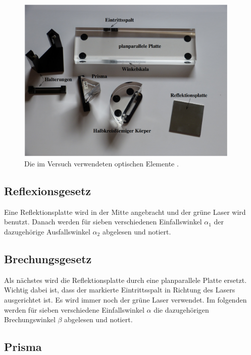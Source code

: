 \begin{figure}[H]
    \centering
    \includegraphics[height=80mm]{bilder/Ab5.png}
    \caption{Die im Versuch verwendeten optischen Elemente \cite{a1}.\label{Abbildung5} }
\end{figure}

\subsection{Reflexionsgesetz}

\begin{flushleft}
    Eine Reflektionsplatte wird in der Mitte angebracht und der grüne Laser wird benutzt.
    Danach werden für sieben verschiedenen Einfallswinkel $\alpha_{1}$ der dazugehörige Ausfallswinkel $\alpha_{2}$ abgelesen und notiert.
\end{flushleft}

\subsection{Brechungsgesetz}

\begin{flushleft}
    Als nächstes wird die Reflektionsplatte durch eine planparallele Platte ersetzt. 
    Wichtig dabei ist, dass der markierte Eintrittsspalt in Richtung des Lasers ausgerichtet ist.
    Es wird immer noch der grüne Laser verwendet.
    Im folgenden werden für sieben verschiedene Einfallswinkel $\alpha$ die dazugehörigen Brechungswinkel $\beta$ abgelesen und notiert.
\end{flushleft}

\subsection{Prisma}

